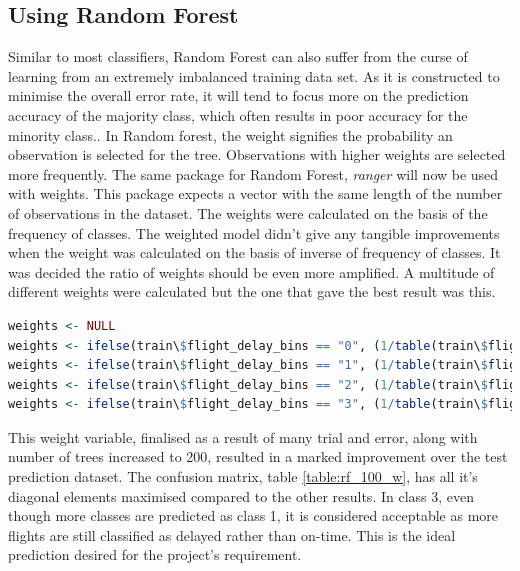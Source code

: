 \subsection{Using Random Forest}
Similar to most classifiers, Random Forest can also suffer from the curse of learning from an extremely imbalanced training data set. As it is constructed to minimise the overall error rate, it will tend to focus more on the prediction accuracy of the majority class, which often results in poor accuracy for the minority class.\cite{Chen2004UsingDatab}. In Random forest, the weight signifies the probability an observation is selected for the tree. Observations with higher weights are selected more frequently. The same package for Random Forest, \textit{ranger} will now be used with weights. This package expects a vector with the same length of the number of observations in the dataset. The weights were calculated on the basis of the frequency of classes. The weighted model didn't give any tangible improvements when the weight was calculated on the basis of inverse of frequency of classes. It was decided the ratio of weights should be even more amplified. A multitude of different weights were calculated but the one that gave the best result was this. 
    
\begin{lstlisting}[language=R, breaklines=true]
weights <- NULL
weights <- ifelse(train\$flight_delay_bins == "0", (1/table(train\$flight_delay_bins)[1]) * 0.10, 0)
weights <- ifelse(train\$flight_delay_bins == "1", (1/table(train\$flight_delay_bins)[2]) * 0.20, weights)
weights <- ifelse(train\$flight_delay_bins == "2", (1/table(train\$flight_delay_bins)[3]) * 0.30 , weights)
weights <- ifelse(train\$flight_delay_bins == "3", (1/table(train\$flight_delay_bins)[4]) * 0.40, weights)
\end{lstlisting}

This weight variable, finalised as a result of many trial and error, along with number of trees increased to 200, resulted in a marked improvement over the test prediction dataset. The confusion matrix, table \ref{table:rf_100_w}, has all it's diagonal elements maximised compared to the other results. In class 3, even though more classes are predicted as class 1, it is considered acceptable as more flights are still classified as delayed rather than on-time. This is the ideal prediction desired for the project's requirement.


